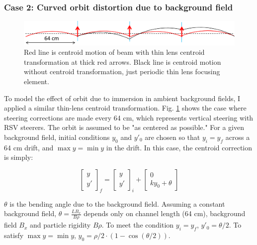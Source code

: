 \subsubsection{Case 2: Curved orbit distortion due to background field}

\begin{figure}
\centering
\includegraphics[width=\textwidth]{5.figures/steeringtolerance/vert_bg_field_distortion_cartoon.png}
\caption{Red line is centroid motion of beam with thin lens centroid transformation at thick red arrows. Black line is centroid motion without centroid transformation, just periodic thin lens focusing element.}
\label{fig:vertcurvedorbitdistortion}
\end{figure}

To model the effect of orbit  due to immersion in ambient background fields, I applied a similar thin-lens centroid transformation. Fig. \ref{fig:vertcurvedorbitdistortion} shows the case where steering corrections are made every 64 cm, which represents vertical steering with RSV steerers. The orbit is assumed to be "as centered as possible." For a given background field, initial conditions $y_0$ and $y'_0$ are chosen so that $y_i=y_f$ across a 64 cm drift, and $\max{y}=\min{y}$ in the drift. In this case, the centroid correction is simply:

\begin{equation}
\begin{bmatrix} y \\ y' \end{bmatrix}_f = \begin{bmatrix} y \\ y' \end{bmatrix}_i + \begin{bmatrix} 0 \\ ky_0 + \theta \end{bmatrix}
\label{eq:curvedorbitdistortion}
\end{equation}

$\theta$ is the bending angle due to the background field. Assuming a constant background field, $\theta = \frac{LB_x}{B \rho}$ depends only on channel length (64 cm), background field $B_x$ and particle rigidity $B \rho$. To meet the condition $y_i=y_f$, $y'_0 = \theta/2$. To satisfy $\max{y}=\min{y}$, $y_0=\rho/2 \cdot ( 1-\cos{(\theta/2)} )$.    


